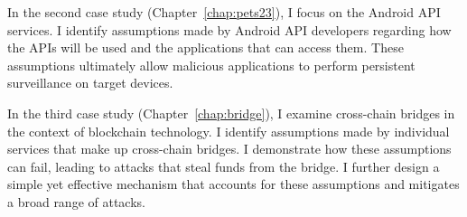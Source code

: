 \begin{dissertationintroduction}
In the second case study (Chapter~\ref{chap:pets23}), I focus on the Android API services. I identify assumptions made by Android API developers regarding how the APIs will be used and the applications that can access them. These assumptions ultimately allow malicious applications to perform persistent surveillance on target devices.

In the third case study (Chapter~\ref{chap:bridge}), I examine cross-chain bridges in the context of blockchain technology. I identify assumptions made by individual services that make up cross-chain bridges.
I demonstrate how these assumptions can fail, leading to attacks that steal funds from the bridge. I further design a simple yet effective mechanism that accounts for these assumptions and mitigates a broad range of attacks.





% 









\end{dissertationintroduction}
